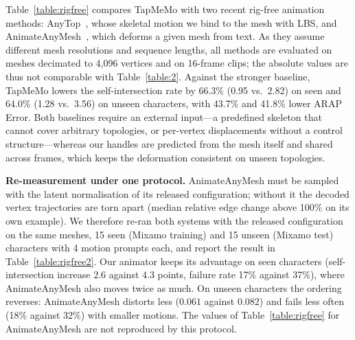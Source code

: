 \documentclass[lettersize,journal]{IEEEtran}
\newenvironment{revblock}{\par\color{red}}{\par}
\newcommand{\blu}[1]{\texorpdfstring{{\leavevmode\color{blue}#1}}{#1}}
\begin{document}
\blu{Table~\ref{table:rigfree} compares TapMeMo with two recent rig-free animation methods:
AnyTop~\cite{gat2025anytop}, whose skeletal motion we bind to the mesh with LBS, and
AnimateAnyMesh~\cite{wu2025animateanymesh}, which deforms a given mesh from text. As they assume
different mesh resolutions and sequence lengths, all methods are evaluated on meshes
decimated to 4,096 vertices and on 16-frame clips; the absolute values are thus not
comparable with Table~\ref{table:2}. Against the stronger baseline, TapMeMo lowers the
self-intersection rate by 66.3\% (0.95 vs.\ 2.82) on seen and 64.0\% (1.28 vs.\ 3.56) on
unseen characters, with 43.7\% and 41.8\% lower ARAP Error. Both baselines require an
external input---a predefined skeleton that cannot cover arbitrary topologies, or per-vertex
displacements without a control structure---whereas our handles are predicted from the mesh
itself and shared across frames, which keeps the deformation consistent on unseen topologies.}

\begin{revblock}
\textbf{Re-measurement under one protocol.} AnimateAnyMesh must be sampled with the latent
normalisation of its released configuration; without it the decoded vertex trajectories are
torn apart (median relative edge change above 100\% on its own example). We therefore re-ran
both systems with the released configuration on the same meshes, 15 seen (Mixamo training) and
15 unseen (Mixamo test) characters with 4 motion prompts each, and report the result in
Table~\ref{table:rigfree2}. Our animator keeps its advantage on seen characters (self-intersection
increase $2.6$ against $4.3$ points, failure rate 17\% against 37\%), where AnimateAnyMesh also
moves twice as much. On unseen characters the ordering reverses: AnimateAnyMesh distorts less
($0.061$ against $0.082$) and fails less often (18\% against 32\%) with smaller motions. The
values of Table~\ref{table:rigfree} for AnimateAnyMesh are not reproduced by this protocol.
\end{revblock}
\end{document}
